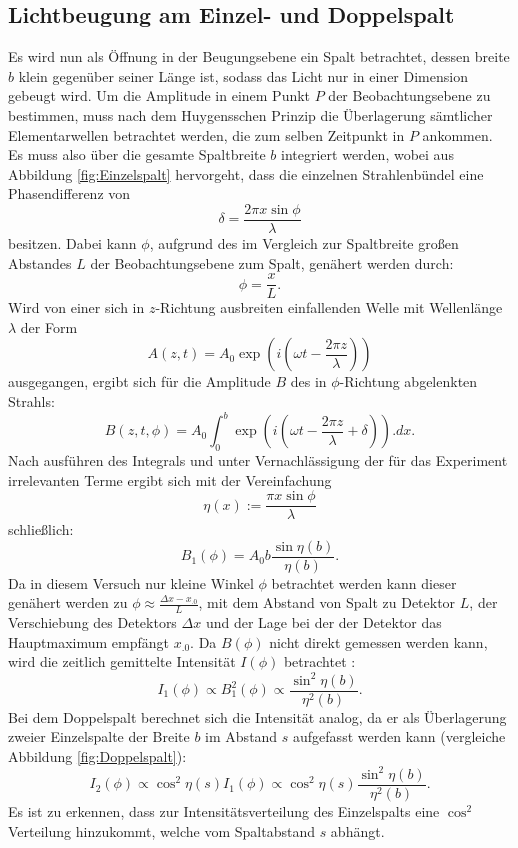 \subsection{Lichtbeugung am Einzel- und Doppelspalt}

Es wird nun als Öffnung in der Beugungsebene ein Spalt betrachtet, dessen breite $b$ klein gegenüber seiner Länge ist, sodass das Licht nur in einer Dimension gebeugt wird. 
Um die Amplitude in einem Punkt $P$ der Beobachtungsebene zu bestimmen, muss nach dem Huygensschen Prinzip die Überlagerung sämtlicher Elementarwellen betrachtet werden, die zum selben Zeitpunkt in $P$ ankommen. Es muss also über die gesamte Spaltbreite $b$ integriert werden, wobei aus Abbildung \ref{fig:Einzelspalt} hervorgeht, dass die einzelnen Strahlenbündel eine Phasendifferenz von 
\[
\delta = \frac{2\pi x \sin \phi}{\lambda}
\]
besitzen. Dabei kann $\phi$, aufgrund des im Vergleich zur Spaltbreite großen Abstandes $L$ der Beobachtungsebene zum Spalt, genähert werden durch:
\begin{equation}
\phi = \frac{x}{L} \text{.}\label{eq:phi}
\end{equation} 
Wird von einer sich in $z$-Richtung ausbreiten einfallenden Welle mit Wellenlänge $\lambda$ der Form
\[
A(z,t) = A_0\exp \left(i\left(\omega t-\frac{2\pi z}{\lambda}\right)\right)
\]
ausgegangen, ergibt sich für die Amplitude $B$ des in $\phi$-Richtung abgelenkten Strahls:
\[
B(z,t,\phi) = A_0 \int_0^b\exp\left(i\left(\omega t-\frac{2\pi z}{\lambda}+\delta\right)\right).dx\text{.}
\]
Nach ausführen des Integrals und unter Vernachlässigung der für das Experiment irrelevanten Terme ergibt sich mit der Vereinfachung
\begin{equation}
\eta(x) := \frac{\pi x \sin \phi}{\lambda} \label{eq:eta}
\end{equation}
schließlich:
\[
B_1(\phi) = A_0b\frac{\sin \eta(b)}{\eta(b)}\text{.}
\]
Da in diesem Versuch nur kleine Winkel $\phi$ betrachtet werden kann dieser genähert werden zu $\phi \approx \frac{\Delta x - x_.0}{L}$, mit dem Abstand von Spalt zu Detektor $L$, der Verschiebung des Detektors $\Delta x$ und der Lage bei der der Detektor das Hauptmaximum empfängt $x_.0$.
Da $B(\phi)$ nicht direkt gemessen werden kann, wird die zeitlich gemittelte Intensität $I(\phi)$ betrachtet :
\begin{equation}
I_1(\phi)\propto B^2_1(\phi) \propto \frac{\sin^2 \eta(b)}{\eta^2(b)}\text{.} \label{eq:I1}
\end{equation}
Bei dem Doppelspalt berechnet sich die Intensität analog, da er als Überlagerung zweier Einzelspalte der Breite $b$ im Abstand $s$ aufgefasst werden kann (vergleiche Abbildung \ref{fig:Doppelspalt}):
\begin{equation}
I_2(\phi) \propto \cos^2\eta(s) I_1(\phi) \propto \cos^2\eta(s)\frac{\sin^2 \eta(b)}{\eta^2(b)}\text{.}\label{eq:I2}
\end{equation}
Es ist zu erkennen, dass zur Intensitätsverteilung des Einzelspalts eine $\cos^2$ Verteilung hinzukommt, welche vom Spaltabstand $s$ abhängt.

